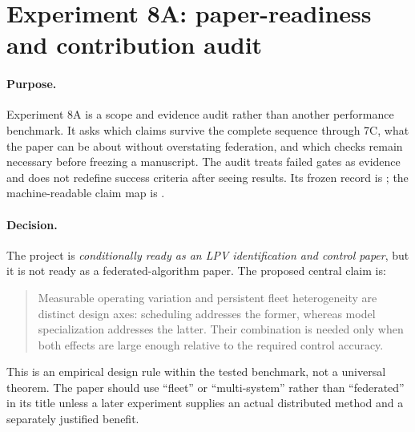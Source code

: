 \section{Experiment 8A: paper-readiness and contribution audit}
\label{sec:experiment8a}

\paragraph{Purpose.}
Experiment 8A is a scope and evidence audit rather than another performance
benchmark. It asks which claims survive the complete sequence through 7C, what
the paper can be about without overstating federation, and which checks remain
necessary before freezing a manuscript. The audit treats failed gates as
evidence and does not redefine success criteria after seeing results. Its frozen
record is ; the machine-readable claim map
is .

\paragraph{Decision.}
The project is \emph{conditionally ready as an LPV identification and control
paper}, but it is not ready as a federated-algorithm paper. The proposed central
claim is:
\begin{quote}
Measurable operating variation and persistent fleet heterogeneity are distinct
design axes: scheduling addresses the former, whereas model specialization
addresses the latter. Their combination is needed only when both effects are
large enough relative to the required control accuracy.
\end{quote}
This is an empirical design rule within the tested benchmark, not a universal
theorem. The paper should use ``fleet'' or ``multi-system'' rather than
``federated'' in its title unless a later experiment supplies an actual
distributed method and a separately justified benefit.

